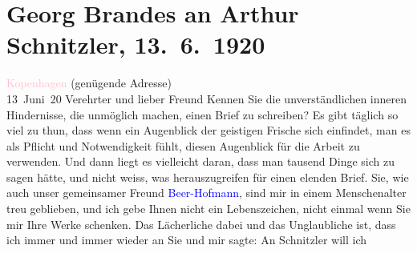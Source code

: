

               \section[Georg Brandes an Arthur Schnitzler, 13. 6. 1920]{ Georg Brandes an Arthur Schnitzler, 13. 6. 1920}\nopagebreak{}\rehead{ }\normalsize\beginnumbering{} \toendnotes[C]{\smallbreak\pagebreak[2]} 
\toendnotes[C]{\smallbreak}\pstart
           \raggedleft{}{\pb}\textcolor{pink}{Kopenhagen}{}\ledrightnote{\textcolor{pink}{Kopenhagen}} (genügende Adresse){\\}13 Juni 20\pend
           \pstart{}Verehrter und lieber Freund \pend\pstart
           Kennen Sie die unverständlichen inneren Hindernisse, die \label{T_L02342_1v}\label{T_L02342_1h} unmöglich machen,
               einen Brief zu schreiben? Es gibt täglich so viel zu thun, dass wenn ein Augenblick
               der geistigen Frische sich einfindet, man es als Pflicht und Notwendigkeit fühlt,
               diesen Augenblick für die Arbeit zu verwenden. Und dann liegt es vielleicht daran,
               dass man tausend Dinge sich zu sagen hätte, und nicht weiss, was herauszugreifen für
               einen elenden Brief. Sie, wie auch unser gemeinsamer Freund \textcolor{blue}{Beer-Hofmann}{}\ledrightnote{\textcolor{blue}{Richard Beer-Hofmann}}, sind mir in einem Menschenalter treu geblieben,
               und ich gebe Ihnen nicht ein Lebenszeichen, nicht einmal wenn Sie mir Ihre Werke
               schenken. Das Lächerliche dabei und das Unglaubliche ist, {\pb}dass ich immer und immer wieder an
               Sie \label{T_L02342_2v}\label{T_L02342_2h} und mir sagte: An Schnitzler will ich
